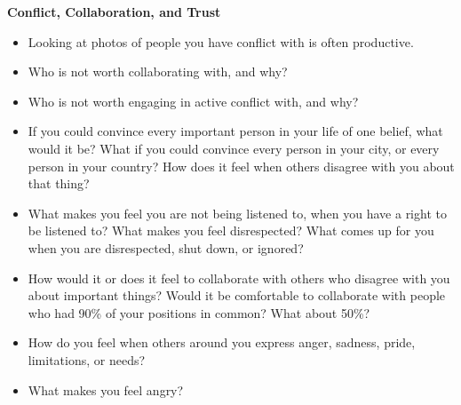 \documentclass[12pt,letterpaper]{book}
\begin{document}
\noindent \textbf{Conflict, Collaboration, and Trust}
\begin{itemize}
    \item Looking at photos of people you have conflict with is often productive.
    \item Who is not worth collaborating with, and why?
    \item Who is not worth engaging in active conflict with, and why?
    \item If you could convince every important person in your life of one belief, what would it be?  What if you could convince every person in your city, or every person in your country? How does it feel when others disagree with you about that thing?
    \item What makes you feel you are not being listened to, when you have a right to be listened to? What makes you feel disrespected? What comes up for you when you are disrespected, shut down, or ignored?
    \item How would it or does it feel to collaborate with others who disagree with you about important things? Would it be comfortable to collaborate with people who had 90\% of your positions in common? What about 50\%?
    \item How do you feel when others around you express anger, sadness, pride, limitations, or needs?
    \item What makes you feel angry?
\end{itemize}
\end{document}
